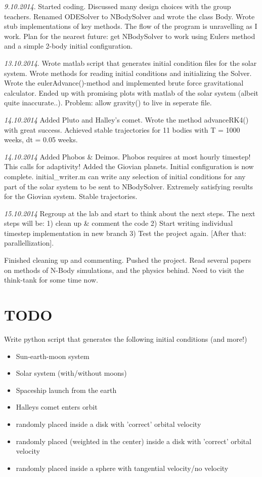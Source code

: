 \documentclass[11pt, oneside]{article}   	%
\begin{document}
\emph{9.10.2014}.
Started coding. Discussed many design choices with the group teachers. Renamed ODESolver to NBodySolver and wrote the class Body. Wrote stub implementations of key methods. The flow of the program is unravelling as I work. Plan for the nearest future: get NBodySolver to work using Eulers method and a simple 2-body initial configuration.  

\emph{13.10.2014}.
Wrote matlab script that generates initial condition files for the solar system. Wrote methods for reading initial conditions and initializing the Solver. Wrote the eulerAdvance()-method and implemented brute force gravitational calculator. Ended up with promising plots with matlab of the solar system (albeit quite inaccurate..). Problem: allow gravity() to live in seperate file. 

\emph{14.10.2014}
Added Pluto and Halley's comet. Wrote the method advanceRK4() with great success. Achieved stable trajectories for 11 bodies with T = 1000 weeks, dt = 0.05 weeks. 

\emph{14.10.2014}
Added Phobos \& Deimos. Phobos requires at most hourly timestep! This calls for adaptivity! Added the Giovian planets. Initial configuration is now complete. initial\_writer.m can write any selection of initial conditions for any part of the solar system to be sent to NBodySolver. Extremely satisfying results for the Giovian system. Stable trajectories. 

\emph{15.10.2014}
Regroup at the lab and start to think about the next steps. The next steps will be: 1) clean up \& comment the code 2) Start writing individual timestep implementation in new branch 3) Test the project again. [After that: parallellization]. 

Finished cleaning up and commenting. Pushed the project. Read several papers on methods of N-Body simulations, and the physics behind. Need to visit the think-tank for some time now.  

\newpage

\section{TODO}

Write python script that generates the following initial conditions (and more!)
\begin{itemize}

\item Sun-earth-moon system
\item Solar system (with/without moons)
\item Spaceship launch from the earth
\item Halleys comet enters orbit

\item randomly placed inside a disk with 'correct' orbital velocity
\item randomly placed (weighted in the center) inside a disk with 'correct' orbital velocity
\item randomly placed inside a sphere with tangential velocity/no velocity

\end{itemize}
\end{document}
